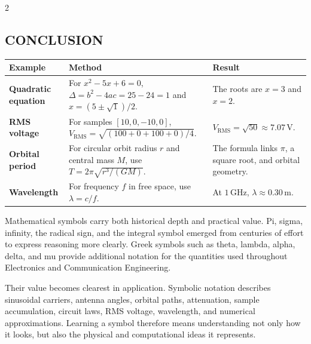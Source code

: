 \begin{multicols}{2}
  \subsection*{\centering\uppercase{Conclusion}}

\begin{center}
\vspace{-0.5em}
\begin{minipage}{0.98\columnwidth}
\centering
    \scriptsize
    \setlength{\tabcolsep}{3pt}
    \renewcommand{\arraystretch}{1.3}
    \begin{tabular}{@{}>{\bfseries\RaggedRight\arraybackslash}p{}
                        >{\RaggedRight\arraybackslash}p{}
                        >{\RaggedRight\arraybackslash}p{}@{}}
      \toprule
      \textbf{Example} & \textbf{Method} & \textbf{Result} \\
      \midrule
      Quadratic equation & For $x^2-5x+6=0$, $\Delta=b^2-4ac=25-24=1$ and $x=(5\pm\sqrt{1})/2$. & The roots are $x=3$ and $x=2$. \\
      RMS voltage & For samples $[10,0,-10,0]$, $V_{\mathrm{RMS}}=\sqrt{(100+0+100+0)/4}$. & $V_{\mathrm{RMS}}=\sqrt{50}\approx7.07\,\mathrm{V}$. \\
      Orbital period & For circular orbit radius $r$ and central mass $M$, use $T=2\pi\sqrt{r^3/(GM)}$. & The formula links $\pi$, a square root, and orbital geometry. \\
      Wavelength & For frequency $f$ in free space, use $\lambda=c/f$. & At $1\,\mathrm{GHz}$, $\lambda\approx0.30\,\mathrm{m}$. \\
      \bottomrule
    \end{tabular}
\end{minipage}
  \end{center}
  
  Mathematical symbols carry both historical depth and practical value. Pi, sigma, infinity, the radical sign, and the integral symbol emerged from centuries of effort to express reasoning more clearly. Greek symbols such as theta, lambda, alpha, delta, and mu provide additional notation for the quantities used throughout Electronics and Communication Engineering.

  \noindent
  Their value becomes clearest in application. Symbolic notation describes sinusoidal carriers, antenna angles, orbital paths, attenuation, sample accumulation, circuit laws, RMS voltage, wavelength, and numerical approximations. Learning a symbol therefore means understanding not only how it looks, but also the physical and computational ideas it represents.


\end{multicols}
